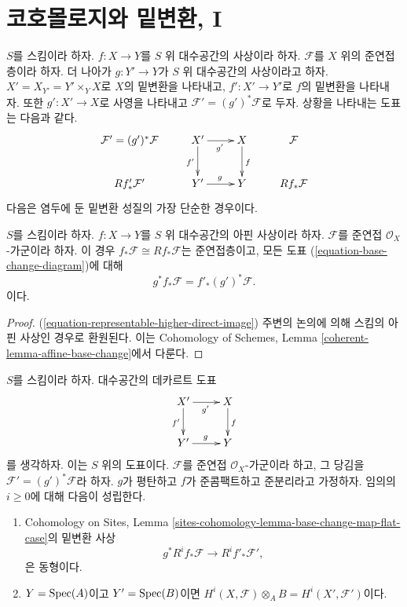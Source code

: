 







\section{코호몰로지와 밑변환, I}
\label{section-cohomology-and-base-change}

\noindent
$S$를 스킴이라 하자. $f : X \to Y$를 $S$ 위 대수공간의 사상이라
하자. $\mathcal{F}$를 $X$ 위의 준연접층이라 하자. 더 나아가
$g : Y' \to Y$가 $S$ 위 대수공간의 사상이라고 하자.
$X' = X_{Y'} = Y' \times_Y X$로 $X$의 밑변환을 나타내고,
$f' : X' \to Y'$로 $f$의 밑변환을 나타내자. 또한
$g' : X' \to X$로 사영을 나타내고
$\mathcal{F}' = (g')^*\mathcal{F}$로 두자. 상황을 나타내는 도표는
다음과 같다.
\begin{equation}
\label{equation-base-change-diagram}
\vcenter{
\xymatrix{
\mathcal{F}' = (g')^*\mathcal{F} &
X' \ar[r]_{g'} \ar[d]_{f'} &
X \ar[d]^f &
\mathcal{F} \\
Rf'_*\mathcal{F}' &
Y' \ar[r]^g &
Y &
Rf_*\mathcal{F}
}
}
\end{equation}
다음은 염두에 둔 밑변환 성질의 가장 단순한 경우이다.

\begin{lemma}
\label{lemma-affine-base-change}
$S$를 스킴이라 하자. $f : X \to Y$를 $S$ 위 대수공간의 아핀
사상이라 하자. $\mathcal{F}$를 준연접 $\mathcal{O}_X$-가군이라 하자.
이 경우 $f_*\mathcal{F} \cong Rf_*\mathcal{F}$는 준연접층이고,
모든 도표 (\ref{equation-base-change-diagram})에 대해
$$
g^*f_*\mathcal{F} = f'_*(g')^*\mathcal{F}.
$$
이다.
\end{lemma}

\begin{proof}
(\ref{equation-representable-higher-direct-image}) 주변의 논의에 의해
스킴의 아핀 사상인 경우로 환원된다. 이는 Cohomology of Schemes,
Lemma \ref{coherent-lemma-affine-base-change}에서 다룬다.
\end{proof}

\begin{lemma}[평탄 밑변환]
\label{lemma-flat-base-change-cohomology}
$S$를 스킴이라 하자. 대수공간의 데카르트 도표
$$
\xymatrix{
X' \ar[d]_{f'} \ar[r]_{g'} & X \ar[d]^f \\
Y' \ar[r]^g & Y
}
$$
를 생각하자. 이는 $S$ 위의 도표이다. $\mathcal{F}$를 준연접
$\mathcal{O}_X$-가군이라 하고,
그 당김을 $\mathcal{F}' = (g')^*\mathcal{F}$라 하자.
$g$가 평탄하고 $f$가 준콤팩트하고 준분리라고 가정하자.
임의의 $i \geq 0$에 대해 다음이 성립한다.
\begin{enumerate}
\item Cohomology on Sites, Lemma
\ref{sites-cohomology-lemma-base-change-map-flat-case}의 밑변환 사상
$$
g^*R^if_*\mathcal{F} \longrightarrow R^if'_*\mathcal{F}',
$$
은 동형이다.
\item $Y = \mathop{\mathrm{Spec}}(A)$이고 $Y' = \mathop{\mathrm{Spec}}(B)$이면
$H^i(X, \mathcal{F}) \otimes_A B = H^i(X', \mathcal{F}')$이다.
\end{enumerate}
\end{lemma}

